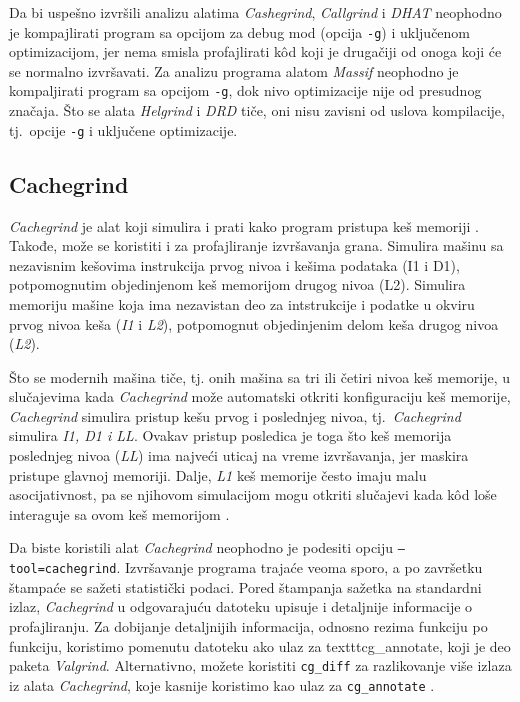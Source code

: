 \documentclass[12pt,oneside]{memoir}
\theoremstyle{plain}
\theoremstyle{definition}
\begin{document}
Da bi uspešno izvršili analizu alatima \textit{Cashegrind}, \textit{Callgrind} i \textit{DHAT} neophodno je kompajlirati program sa opcijom za debug mod (opcija \texttt{-g}) i uključenom optimizacijom, jer nema smisla profajlirati k\^od koji je drugačiji od onoga koji će se normalno izvršavati. Za analizu programa alatom \textit{Massif} neophodno je kompaljirati program sa opcijom \texttt{-g}, dok nivo optimizacije nije od presudnog značaja. Što se alata \textit{Helgrind} i \textit{DRD} tiče, oni nisu zavisni od uslova kompilacije, tj.~opcije \texttt{-g} i uključene optimizacije.

\subsection{Cachegrind}
\textit{Cachegrind} je alat koji simulira i prati kako program pristupa keš memoriji \cite{Cachegrind}. Takođe, može se koristiti i za profajliranje izvršavanja grana. Simulira mašinu sa nezavisnim kešovima instrukcija prvog nivoa i kešima podataka (I1 i D1), potpomognutim objedinjenom keš memorijom drugog nivoa (L2). Simulira memoriju mašine koja ima nezavistan deo za intstrukcije i podatke u okviru prvog nivoa keša (\textit{I1} i \textit{L2}), potpomognut objedinjenim delom keša drugog nivoa (\textit{L2}).

Što se modernih mašina tiče, tj. onih mašina sa tri ili četiri nivoa keš memorije, u slučajevima kada \textit{Cachegrind} može automatski otkriti konfiguraciju keš memorije, \textit{Cachegrind} simulira pristup kešu prvog i poslednjeg nivoa, tj.~\textit{Cachegrind} simulira \textit{I1, D1 i LL}. Ovakav pristup posledica je toga što keš memorija poslednjeg nivoa (\textit{LL}) ima najveći uticaj na vreme izvršavanja, jer maskira pristupe glavnoj memoriji. Dalje, \textit{L1} keš memorije često imaju malu asocijativnost, pa se njihovom simulacijom mogu otkriti slučajevi kada k\^od loše interaguje sa ovom keš memorijom \cite{Cachegrind}.

Da biste koristili alat \textit{Cachegrind} neophodno je podesiti opciju \texttt{–tool=cachegrind}. Izvršavanje programa trajaće veoma sporo, a po završetku štampaće se sažeti statistički podaci. Pored štampanja sažetka na standardni izlaz, \textit{Cachegrind} u odgovarajuću datoteku upisuje i detaljnije informacije o profajliranju. Za dobijanje detaljnijih informacija, odnosno rezima funkciju po funkciju, koristimo pomenutu datoteku ako ulaz za texttt{cg\_annotate}, koji je deo paketa \textit{Valgrind}. Alternativno, možete koristiti \texttt{cg\_diff} za razlikovanje više izlaza iz alata \textit{Cachegrind}, koje kasnije koristimo kao ulaz za \texttt{cg\_annotate} \cite{Cachegrind}.
\end{document}
